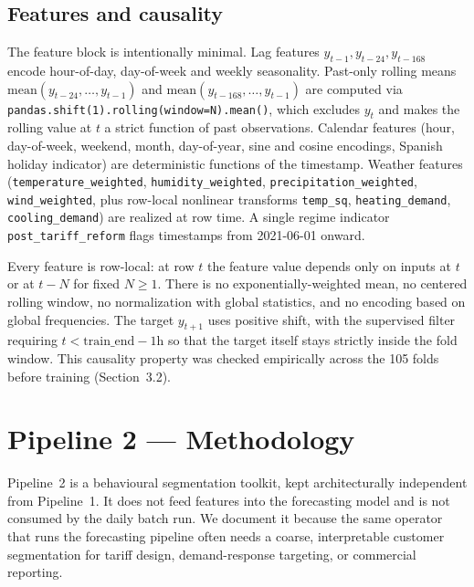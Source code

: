 \documentclass[11pt]{article}
\begin{document}
\subsection{Features and causality}

The feature block is intentionally minimal. Lag features
$y_{t-1}, y_{t-24}, y_{t-168}$ encode hour-of-day, day-of-week and weekly
seasonality. Past-only rolling means
$\text{mean}(y_{t-24}, \ldots, y_{t-1})$ and
$\text{mean}(y_{t-168}, \ldots, y_{t-1})$ are computed via
\verb|pandas.shift(1).rolling(window=N).mean()|, which excludes $y_t$ and
makes the rolling value at $t$ a strict function of past observations.
Calendar features (hour, day-of-week, weekend, month, day-of-year, sine
and cosine encodings, Spanish holiday indicator) are deterministic
functions of the timestamp. Weather features
(\texttt{temperature\_weighted}, \texttt{humidity\_weighted},
\texttt{precipitation\_weighted}, \texttt{wind\_weighted}, plus row-local
nonlinear transforms \texttt{temp\_sq}, \texttt{heating\_demand},
\texttt{cooling\_demand}) are realized at row time. A single regime
indicator \texttt{post\_tariff\_reform} flags timestamps from 2021-06-01
onward.

Every feature is row-local: at row $t$ the feature value depends only on
inputs at $t$ or at $t - N$ for fixed $N \geq 1$. There is no
exponentially-weighted mean, no centered rolling window, no normalization
with global statistics, and no encoding based on global frequencies. The
target $y_{t+1}$ uses positive shift, with the supervised filter requiring
$t < \text{train\_end} - 1\text{h}$ so that the target itself stays
strictly inside the fold window. This causality property was checked
empirically across the 105 folds before training (Section~3.2).

\section{Pipeline 2 --- Methodology}

Pipeline~2 is a behavioural segmentation toolkit, kept architecturally
independent from Pipeline~1. It does not feed features into the
forecasting model and is not consumed by the daily batch run. We document
it because the same operator that runs the forecasting pipeline often
needs a coarse, interpretable customer segmentation for tariff design,
demand-response targeting, or commercial reporting.
\end{document}
